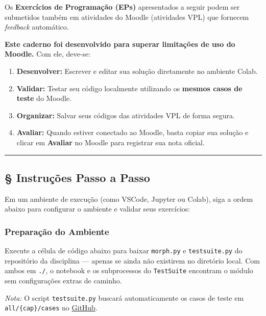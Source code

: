 \documentclass[
  portuguese,
  letterpaper,
  openany,
  oneside,
  12pt,
  a4paper]{book}
\providecommand{\tightlist}{%
  \setlength{\itemsep}{0pt}\setlength{\parskip}{0pt}}
\begin{document}
Os \textbf{Exercícios de Programação (EPs)} apresentados a seguir podem
ser submetidos também em atividades do Moodle (atividades VPL) que
fornecem \emph{feedback} automático.

\textbf{Este caderno foi desenvolvido para superar limitações de uso do
Moodle.} Com ele, deve-se:

\begin{enumerate}
\def\labelenumi{\arabic{enumi}.}
\tightlist
\item
  \textbf{Desenvolver:} Escrever e editar sua solução diretamente no
  ambiente Colab.
\item
  \textbf{Validar:} Testar seu código localmente utilizando os
  \textbf{mesmos casos de teste} do Moodle.
\item
  \textbf{Organizar:} Salvar seus códigos das atividades VPL de forma
  segura.
\item
  \textbf{Avaliar:} Quando estiver conectado ao Moodle, basta copiar sua
  solução e clicar em \textbf{Avaliar} no Moodle para registrar sua nota
  oficial.
\end{enumerate}

\begin{center}\rule{0.5\linewidth}{0.5pt}\end{center}

\subsection*{\texorpdfstring{\S{} Instruções Passo a
Passo}{ Instruções Passo a Passo}}\label{instruuxe7uxf5es-passo-a-passo}

Em um ambiente de execução (como VSCode, Jupyter ou Colab), siga a ordem
abaixo para configurar o ambiente e validar seus exercícios:

\subsubsection*{Preparação do
Ambiente}\label{preparauxe7uxe3o-do-ambiente}

Execute a célula de código abaixo para baixar \texttt{morph.py} e
\texttt{testsuite.py} do repositório da disciplina --- apenas se ainda
não existirem no diretório local. Com ambos em \texttt{./}, o notebook e
os subprocessos do \texttt{TestSuite} encontram o módulo sem
configurações extras de caminho.

\emph{Nota:} O script \texttt{testsuite.py} buscará automaticamente os
casos de teste em \texttt{all/\{cap\}/cases} no
\href{https://github.com/fzampirolli/pdi-vc/tree/master/all}{GitHub}.
\end{document}
